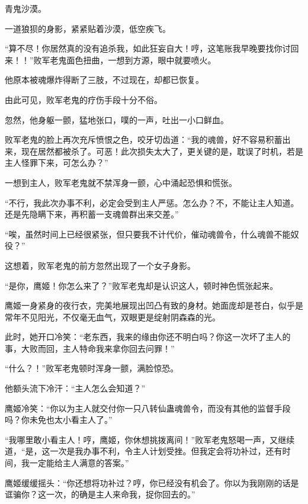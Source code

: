 
\begin{this_body}



青鬼沙漠。

一道狼狈的身影，紧紧贴着沙漠，低空疾飞。

“算不尽！你居然真的没有追杀我，如此狂妄自大！哼，这笔账我早晚要找你讨回来！！”败军老鬼面色扭曲，一想到方源，眼中就要喷火。

他原本被魂爆炸得断了三肢，不过现在，却都已恢复。

由此可见，败军老鬼的疗伤手段十分不俗。

忽然，他身躯一颤，猛地张口，噗的一声，吐出一小口鲜血。

败军老鬼的脸上再次充斥愤恨之色，咬牙切齿道：“我的魂兽，好不容易积蓄出来，现在居然都被杀了。可恶！此次损失太大了，更关键的是，耽误了时机，若是主人怪罪下来，可怎么办？”

一想到主人，败军老鬼就不禁浑身一颤，心中涌起恐惧和慌张。

“不行，我此次办事不利，必定会受到主人严惩。怎么办？不，不能让主人知道。还是先隐瞒下来，再积蓄一支魂兽群出来交差。”

“唉，虽然时间上已经很紧张，但只要我不计代价，催动魂兽令，什么魂兽不能奴役？”

这想着，败军老鬼的前方忽然出现了一个女子身影。

“是你，鹰姬！你怎么来了？”败军老鬼却是认识这人，顿时神色慌张起来。

鹰姬一身紧身的夜行衣，完美地展现出凹凸有致的身材。她面庞却是苍白，似乎是常年不见阳光，不仅毫无血气，双眼更是绽射阴森森的光。

此时，她开口冷笑：“老东西，我来的缘由你还不明白吗？你这一次坏了主人的事，大败而回，主人特命我来拿你回去问罪！”

“什么？！”败军老鬼顿时浑身一颤，满脸惊恐。

他额头流下冷汗：“主人怎么会知道？”

鹰姬冷笑：“你以为主人就交付你一只八转仙蛊魂兽令，而没有其他的监督手段吗？你未免也太小看主人了。”

“我哪里敢小看主人！哼，鹰姬，你休想挑拨离间！”败军老鬼怒喝一声，又继续道，“是，这一次是我办事不利，令主人计划受挫。但我定会将功补过，还有时间，我一定能给主人满意的答案。”

鹰姬缓缓摇头：“你还想将功补过？哼，你已经没有机会了。你以为我刚刚的话是诓骗你？这一次，的确是主人来命我，捉你回去的。”


\end{this_body}
